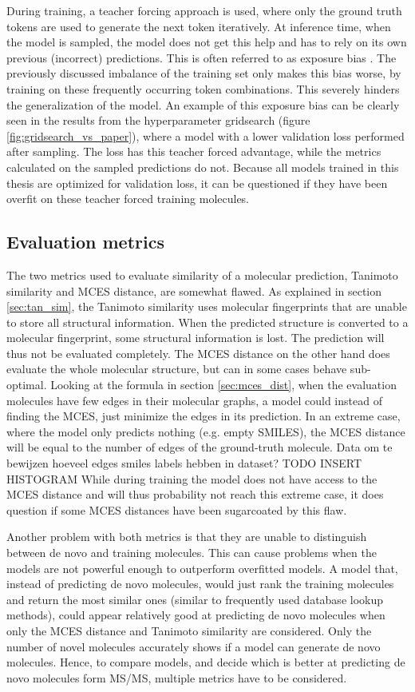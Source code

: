 During training, a teacher forcing approach is used, where only the ground truth tokens are used to generate the next token iteratively.
At inference time, when the model is sampled, the model does not get this help and has to rely on its own previous (incorrect) predictions.
This is often referred to as exposure bias \cite{schmidt2019generalization}.
The previously discussed imbalance of the training set only makes this bias worse, by training on these frequently occurring token combinations.
This severely hinders the generalization of the model.
An example of this exposure bias can be clearly seen in the results from the hyperparameter gridsearch (figure \ref{fig:gridsearch_vs_paper}), where a model with a lower validation loss performed after sampling.
The loss has this teacher forced advantage, while the metrics calculated on the sampled predictions do not.
Because all models trained in this thesis are optimized for validation loss, it can be questioned if they have been overfit on these teacher forced training molecules.

\subsection{Evaluation metrics}
The two metrics used to evaluate similarity of a molecular prediction, Tanimoto similarity and \ac{MCES} distance, are somewhat flawed.
As explained in section \ref{sec:tan_sim}, the Tanimoto similarity uses molecular fingerprints that are unable to store all structural information.
When the predicted structure is converted to a molecular fingerprint, some structural information is lost.
The prediction will thus not be evaluated completely.
The \ac{MCES} distance on the other hand does evaluate the whole molecular structure, but can in some cases behave sub-optimal.
Looking at the formula in section \ref{sec:mces_dist}, when the evaluation molecules have few edges in their molecular graphs, a model could instead of finding the \acf{MCES}, just minimize the edges in its prediction.
In an extreme case, where the model only predicts nothing (e.g. empty SMILES), the MCES distance will be equal to the number of edges of the ground-truth molecule.
Data om te bewijzen hoeveel edges smiles labels hebben in dataset? TODO INSERT HISTOGRAM
While during training the model does not have access to the MCES distance and will thus probability not reach this extreme case, it does question if some \ac{MCES} distances have been sugarcoated by this flaw.

Another problem with both metrics is that they are unable to distinguish between de novo and training molecules.
This can cause problems when the models are not powerful enough to outperform overfitted models.
A model that, instead of predicting de novo molecules, would just rank the training molecules and return the most similar ones (similar to frequently used database lookup methods), could appear relatively good at predicting de novo molecules when only the \ac{MCES} distance and Tanimoto similarity are considered.
Only the number of novel molecules accurately shows if a model can generate de novo molecules.
Hence, to compare models, and decide which is better at predicting de novo molecules form \ac{MS/MS}, multiple metrics have to be considered.


